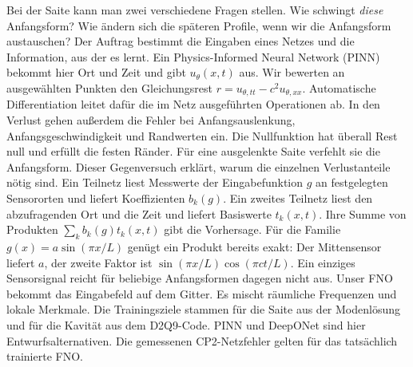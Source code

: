 Bei der Saite kann man zwei verschiedene Fragen stellen. Wie schwingt \emph{diese} Anfangsform? Wie ändern sich die späteren Profile, wenn wir die Anfangsform austauschen? Der Auftrag bestimmt die Eingaben eines Netzes und die Information, aus der es lernt.
Ein Physics-Informed Neural Network (PINN) bekommt hier Ort und Zeit und gibt \(u_\theta(x,t)\) aus. Wir bewerten an ausgewählten Punkten den Gleichungsrest \(r=u_{\theta,tt}-c^2u_{\theta,xx}\). Automatische Differentiation leitet dafür die im Netz ausgeführten Operationen ab. In den Verlust gehen außerdem die Fehler bei Anfangsauslenkung, Anfangsgeschwindigkeit und Randwerten ein. Die Nullfunktion hat überall Rest null und erfüllt die festen Ränder. Für eine ausgelenkte Saite verfehlt sie die Anfangsform. Dieser Gegenversuch erklärt, warum die einzelnen Verlustanteile nötig sind.
Ein Teilnetz liest Messwerte der Eingabefunktion \(g\) an festgelegten Sensororten und liefert Koeffizienten \(b_k(g)\). Ein zweites Teilnetz liest den abzufragenden Ort und die Zeit und liefert Basiswerte \(t_k(x,t)\). Ihre Summe von Produkten \(\sum_k b_k(g)t_k(x,t)\) gibt die Vorhersage. Für die Familie \(g(x)=a\sin(\pi x/L)\) genügt ein Produkt bereits exakt: Der Mittensensor liefert \(a\), der zweite Faktor ist \(\sin(\pi x/L)\cos(\pi ct/L)\). Ein einziges Sensorsignal reicht für beliebige Anfangsformen dagegen nicht aus.
Unser FNO bekommt das Eingabefeld auf dem Gitter. Es mischt räumliche Frequenzen und lokale Merkmale. Die Trainingsziele stammen für die Saite aus der Modenlösung und für die Kavität aus dem D2Q9-Code. PINN und DeepONet sind hier Entwurfsalternativen. Die gemessenen CP2-Netzfehler gelten für das tatsächlich trainierte FNO.

